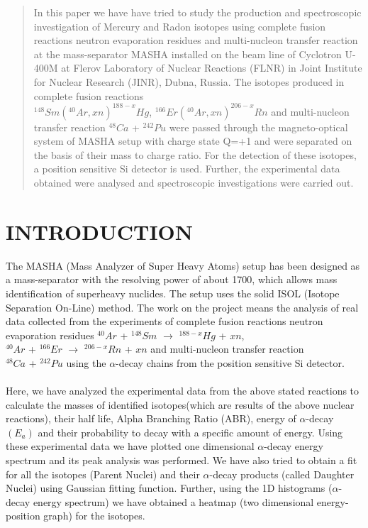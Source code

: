 \documentclass[12pt]{article}
\begin{document}

\tableofcontents
\clearpage

\begin{abstract}
In this paper we have have tried to study the production and spectroscopic investigation of Mercury and Radon isotopes using complete fusion reactions neutron evaporation residues and multi-nucleon transfer reaction at the mass-separator MASHA installed on the beam line of Cyclotron U-400M at Flerov Laboratory of Nuclear Reactions (FLNR) in Joint Institute for Nuclear Research (JINR), Dubna, Russia. The isotopes produced in complete fusion reactions\\
 $^{148}Sm(^{40}Ar,xn)^{188-x}Hg$, $^{166}Er(^{40}Ar,xn)^{206-x}Rn$ and multi-nucleon transfer reaction $^{48}Ca$ + $^{242}Pu$ were passed through the magneto-optical system of MASHA setup with charge state Q=+1 and were separated on the basis of their mass to charge ratio. For the detection of these isotopes, a position sensitive Si detector is used. Further, the experimental data obtained were analysed and spectroscopic investigations were carried out.
\end{abstract}

\section{INTRODUCTION}
The MASHA (Mass Analyzer of Super Heavy Atoms) setup has been designed as a mass-separator with the resolving power of about 1700, which allows mass identification of superheavy nuclides. The setup uses the solid ISOL (Isotope Separation On-Line) method. The work on the project means the analysis of real data collected from the experiments of complete fusion reactions neutron evaporation residues $^{40}Ar$ + $^{148}Sm$ $\rightarrow$ $^{188-x}Hg$ + $xn$,\\ $^{40}Ar$ + $^{166}Er$ $\rightarrow$ $^{206-x}Rn$ + $xn$  and multi-nucleon transfer reaction\\ $^{48}Ca$ + $^{242}Pu$ using the $\alpha$-decay chains from the position sensitive Si detector.\\
\\
Here, we have analyzed the experimental data from the above stated reactions to calculate the masses of identified isotopes(which are results of the above nuclear reactions), their half life, Alpha Branching Ratio (ABR), energy of $\alpha$-decay $(E_a)$ and their probability to decay with a specific amount of energy. Using these experimental data we have plotted one dimensional $\alpha$-decay energy spectrum and its peak analysis was performed. We have also tried to obtain a fit for all the isotopes (Parent Nuclei) and their $\alpha$-decay products (called Daughter Nuclei) using Gaussian fitting function. Further, using the 1D histograms ($\alpha$-decay energy spectrum) we have obtained a heatmap (two dimensional energy-position graph) for the isotopes.
\clearpage
\end{document}
